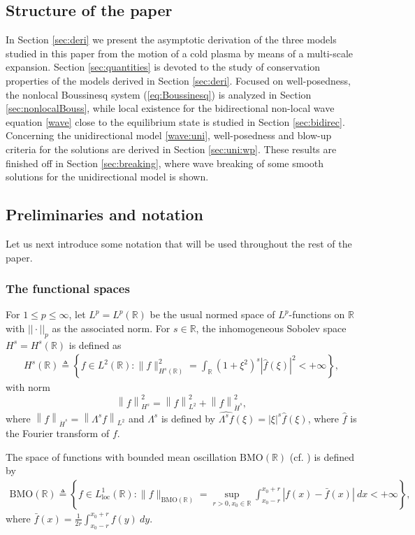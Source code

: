 \documentclass[final,11pt,a4paper,reqno]{amsart}
\newcommand{\norm}[1]{\left\| #1 \right\|}
\newcommand{\av}[1]{\left| #1 \right|}
\newcommand{\RR}{\mathbb R}
\theoremstyle{definition}
\begin{document}
\subsection{Structure of the paper} 
In Section \ref{sec:deri} we present the asymptotic derivation of the three models studied in this paper from the motion of a cold plasma by means of a multi-scale expansion. Section \ref{sec:quantities} is devoted to the study of conservation properties of the models derived in Section \ref{sec:deri}. Focused on well-posedness, the nonlocal Boussinesq system (\ref{eq:Boussinesq}) is analyzed in Section \ref{sec:nonlocalBouss}, while local existence for the bidirectional non-local wave equation \eqref{wave} close to the equilibrium state is studied in Section \ref{sec:bidirec}. Concerning the unidirectional model \eqref{wave:uni}, well-posedness and blow-up criteria for the solutions are derived in Section \ref{sec:uni:wp}. These results are finished off in Section \ref{sec:breaking}, where wave breaking of some smooth solutions for the unidirectional model is shown.



\subsection{Preliminaries and notation}
Let us next introduce some notation that will be used throughout the rest of the paper.  

\subsubsection*{\textsf{The functional spaces}}
For $1\leq p\leq\infty$, let $L^{p}=L^{p}(\RR)$ be the usual normed space of $L^{p}$-functions on $\RR$ with $||\cdot ||_{p}$ as the associated norm. For $s\in\RR$, the inhomogeneous Sobolev space $H^{s}=H^s(\RR)$ is defined as
	\begin{align*}
		H^s(\RR)\triangleq\left\{f\in L^2(\RR):\|f\|_{H^s(\RR)}^2=\int_\RR(1+\xi^2)^s|\widehat{f}(\xi)|^2<+\infty\right\},
	\end{align*}
with norm 
\[ \norm{f}_{H^s}^{2}=\norm{f}_{L^2}^2+\norm{f}_{\dot{H}^s}^{2}, \]
where $\norm{f}_{\dot{H}^s}=\norm{\Lambda^{s}f}_{L^2}$ and $\Lambda^{s}$ is defined by
$\widehat{\Lambda^sf}(\xi)=|\xi|^{s}\widehat{f}(\xi)$, where $\widehat{f}$ is the Fourier transform of $f$.
 

	
The space of functions with bounded mean oscillation $\text{BMO}(\RR)$ (cf. \cite{Stein1, Stein2}) is defined by
\begin{align*}
		\text{BMO}(\RR)\triangleq\left\{f\in L^{1}_{\text{loc}}(\RR):\|f\|_{\text{BMO}(\RR)}=\displaystyle\sup_{r>0,x_{0}\in\RR}\int_{x_{0}-r}^{x_{0}+r} \av{f(x)-\bar{f}(x)}\  dx<+\infty\right\},
	\end{align*}
where $\bar{f}(x)=\frac {1}{2r}\int_{x_{0}-r}^{x_{0}+r} f(y) \ dy$.\\	
\end{document}
